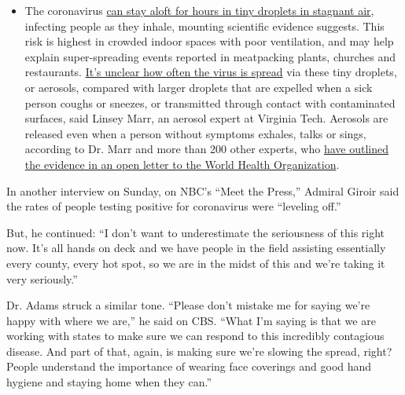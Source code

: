 \begin{itemize}
  \begin{itemize}
  \tightlist
  \item
    The coronavirus
    \href{https://www.nytimes3xbfgragh.onion/2020/07/04/health/239-experts-with-one-big-claim-the-coronavirus-is-airborne.html?action=click\&pgtype=Article\&state=default\&region=MAIN_CONTENT_3\&context=storylines_faq}{can
    stay aloft for hours in tiny droplets in stagnant air}, infecting
    people as they inhale, mounting scientific evidence suggests. This
    risk is highest in crowded indoor spaces with poor ventilation, and
    may help explain super-spreading events reported in meatpacking
    plants, churches and restaurants.
    \href{https://www.nytimes3xbfgragh.onion/2020/07/06/health/coronavirus-airborne-aerosols.html?action=click\&pgtype=Article\&state=default\&region=MAIN_CONTENT_3\&context=storylines_faq}{It's
    unclear how often the virus is spread} via these tiny droplets, or
    aerosols, compared with larger droplets that are expelled when a
    sick person coughs or sneezes, or transmitted through contact with
    contaminated surfaces, said Linsey Marr, an aerosol expert at
    Virginia Tech. Aerosols are released even when a person without
    symptoms exhales, talks or sings, according to Dr. Marr and more
    than 200 other experts, who
    \href{https://academic.oup.com/cid/article/doi/10.1093/cid/ciaa939/5867798}{have
    outlined the evidence in an open letter to the World Health
    Organization}.
  \end{itemize}
\end{itemize}

In another interview on Sunday, on NBC's ``Meet the Press,'' Admiral
Giroir said the rates of people testing positive for coronavirus were
``leveling off.''

But, he continued: ``I don't want to underestimate the seriousness of
this right now. It's all hands on deck and we have people in the field
assisting essentially every county, every hot spot, so we are in the
midst of this and we're taking it very seriously.''

Dr. Adams struck a similar tone. ``Please don't mistake me for saying
we're happy with where we are,'' he said on CBS. ``What I'm saying is
that we are working with states to make sure we can respond to this
incredibly contagious disease. And part of that, again, is making sure
we're slowing the spread, right? People understand the importance of
wearing face coverings and good hand hygiene and staying home when they
can.''

